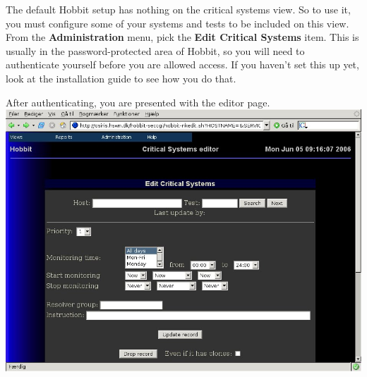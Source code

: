  The default Hobbit setup has nothing on the critical systems view. So to use it, you must configure some of your systems and tests to be included on this view. From the \textbf{Administration}
 menu, pick the \textbf{Edit Critical Systems}
 item. This is usually in the password-protected area of Hobbit, so you will need to authenticate yourself before you are allowed access. If you haven't set this up yet, look at the installation guide to see how you do that.


 After authenticating, you are presented with the editor page. \includegraphics[scale=1]{./editor-main.png} 
